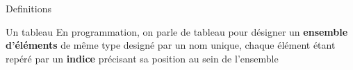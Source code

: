 \begin{frame}{Definitions}
    \pause
    \begin{block}{Un tableau}
        En programmation,
        on parle de tableau pour d\'esigner un \textbf{ensemble d'\'el\'ements} de m\^eme type design\'e par un nom unique,
        chaque \'el\'ement \'etant rep\'er\'e par un \textbf{indice} pr\'ecisant sa position au sein de l'ensemble
    \end{block}
\end{frame}